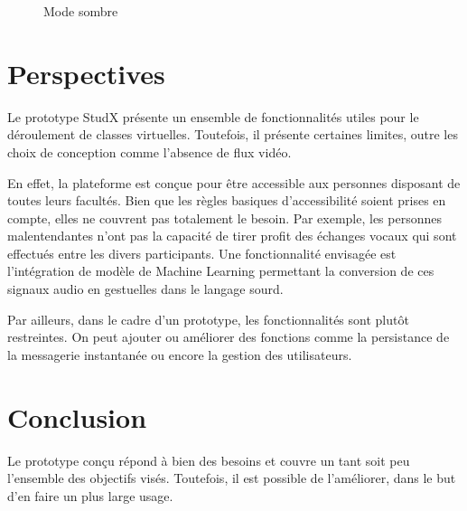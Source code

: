 \begin{figure}[h]
  \centering
  \caption{Mode sombre}
  \label{fig:settings_two}
\end{figure}

\newpage
\section{Perspectives}
Le prototype StudX présente un ensemble de fonctionnalités utiles pour le déroulement de classes virtuelles. 
Toutefois, il présente certaines limites, outre les choix de conception comme l’absence de flux vidéo. 

En effet, la plateforme est conçue pour être accessible aux personnes disposant de toutes leurs facultés. 
Bien que les règles basiques d'accessibilité soient prises en compte, 
elles ne couvrent pas totalement le besoin. Par exemple, les personnes malentendantes 
n’ont pas la capacité de tirer profit des échanges vocaux qui sont effectués entre les divers participants. 
Une fonctionnalité envisagée est l'intégration de modèle de Machine Learning permettant la conversion de 
ces signaux audio en gestuelles dans le langage sourd.

Par ailleurs, dans le cadre d’un prototype, les fonctionnalités sont plutôt restreintes. 
On peut ajouter ou améliorer des fonctions comme la persistance de la messagerie instantanée ou 
encore la gestion des utilisateurs.


\section*{Conclusion}
Le prototype conçu répond à bien des besoins et couvre un tant soit peu l’ensemble des objectifs visés. 
Toutefois, il est possible de l’améliorer, dans le but d’en faire un plus large usage.